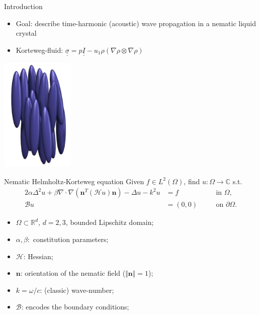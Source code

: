 \documentclass[11pt,aspectratio=169,xcolor=dvipsnames]{beamer}
\begin{document}
\begin{frame}{Introduction}
  \begin{minipage}{0.7\textwidth}
    \begin{itemize}
      \item \alert{Goal:} describe time-harmonic (acoustic) wave propagation in a nematic liquid crystal 
      \item Korteweg-fluid: $\underline{\underline{\sigma}} = p \underline{\underline{I}} - u_1 \rho (\nabla \rho \otimes \nabla \rho)$
    \end{itemize}
  \end{minipage}
  \hfill
  \begin{minipage}{0.29\textwidth}
    \begin{center}
      \includegraphics[width=3.5cm,keepaspectratio]{LiquidCrystal-MesogenOrder-Nematic.jpeg}
    \end{center}
  \end{minipage}
\end{frame}


\begin{frame}{Nematic Helmholtz-Korteweg equation\footnotemark}
  Given $f \in L^2(\Omega)$, find $u : \Omega \to \mathbb{C}$ s.t. 
  \begin{alignat*}{2}
    \alpha \Delta^2 u + \beta \nabla \cdot \nabla(\bm{n}^T (\mathcal{H} u) \bm{n}) - \Delta u - k^2 u &= f \quad &&\text{in } \Omega, \\
    \mathcal{B}u &= (0,0) \quad &&\text{on } \partial \Omega.
  \end{alignat*}
  \begin{itemize}
    \item $\Omega \subset \mathbb{R}^d$, $d = 2,3$, bounded Lipschitz domain;
    \item $\alpha, \beta:$ constitution parameters;
    \item $\mathcal{H}$: Hessian;
    \item $\bm{n}$: orientation of the nematic field ($\Vert \bm{n} \Vert = 1$);
    \item $k = \omega / c$: (classic) wave-number;
    \item $\mathcal{B}$: encodes the boundary conditions;
  \end{itemize}
\end{frame}
\end{document}
